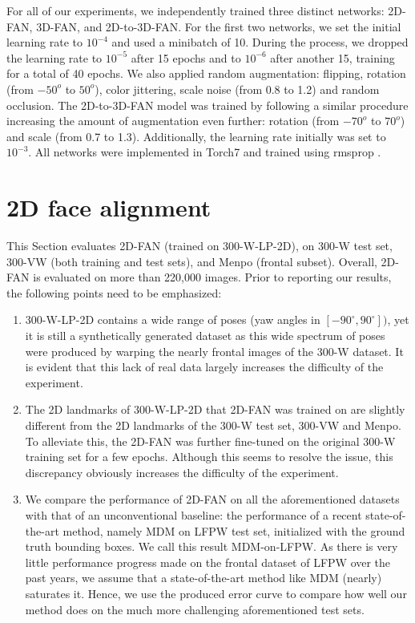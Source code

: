 	For all of our experiments, we independently trained three distinct networks: 2D-FAN, 3D-FAN, and 2D-to-3D-FAN. For the first two networks, we set the initial learning rate to $10^{-4}$ and used a minibatch of 10. During the process, we dropped the learning rate to $10^{-5}$ after 15 epochs and to $10^{-6}$ after another 15, training for a total of 40 epochs. We also applied random augmentation: flipping, rotation (from $-50^o$ to $50^o$), color jittering, scale noise (from 0.8 to 1.2) and random occlusion. The 2D-to-3D-FAN model was trained by following a similar procedure increasing the amount of augmentation even further: rotation (from $-70^o$ to $70^o$) and scale (from 0.7 to 1.3). Additionally, the learning rate initially was set to $10^{-3}$. All networks were implemented in Torch7 \cite{collobert2011torch7} and trained using rmsprop \cite{tieleman2012lecture}.

	\section{2D face alignment} \label{sec:2D}

	This Section evaluates 2D-FAN (trained on 300-W-LP-2D), on 300-W test set, 300-VW (both training and test sets), and Menpo (frontal subset). Overall, 2D-FAN is evaluated on more than 220,000 images. Prior to reporting our results, the following points need to be emphasized:

\begin{enumerate}[leftmargin=*]

		\item
		300-W-LP-2D contains a wide range of poses (yaw angles in $[-90^\circ, 90^\circ])$, yet it is still a synthetically generated dataset as this wide spectrum of poses were produced by warping the nearly frontal images of the 300-W dataset. It is evident that this lack of real data largely increases the difficulty of the experiment. 
		\item 
		The 2D landmarks of 300-W-LP-2D that 2D-FAN was trained on are slightly different from the 2D landmarks of the 300-W test set, 300-VW and Menpo. To alleviate this, the 2D-FAN was further fine-tuned on the original 300-W training set for a few epochs. Although this seems to resolve the issue, this discrepancy obviously increases the difficulty of the experiment. 
		\item
		We compare the performance of 2D-FAN on all the aforementioned datasets with that of an unconventional baseline: the performance of a recent state-of-the-art method, namely MDM \cite{trigeorgismnemonic} on LFPW test set, initialized with the ground truth bounding boxes. We call this result MDM-on-LFPW.  As there is very little performance progress made on the frontal dataset of LFPW over the past years, we assume that a state-of-the-art method like MDM (nearly) saturates it. Hence, we use the produced error curve to compare how well our method does on the much more challenging aforementioned test sets.
	\end{enumerate}

